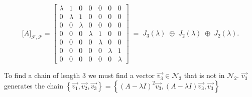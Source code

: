 \documentclass{report}
\begin{document}
{    \[
\bigl[A\bigr]_{\mathcal{F},\mathcal{F}}
=
\left[
\begin{array}{ccc|cc|cc}
\lambda & 1 & 0 & 0 & 0 & 0 & 0\\
0 & \lambda & 1 & 0 & 0 & 0 & 0\\
0 & 0 & \lambda & 0 & 0 & 0 & 0\\ \hline
0 & 0 & 0 & \lambda & 1 & 0 & 0\\
0 & 0 & 0 & 0 & \lambda & 0 & 0\\ \hline
0 & 0 & 0 & 0 & 0 & \lambda & 1\\
0 & 0 & 0 & 0 & 0 & 0 & \lambda
\end{array}
\right]
\;=\;
J_{3}(\lambda)\;\oplus\;J_{2}(\lambda)\;\oplus\;J_{2}(\lambda).
\]




  To find a chain of length $ 3$  we must find a vector $ \vec{ v_3} \in \mathcal{N} _3$  that is not in $ \mathcal{N} _2$. $ \vec{ v_3} $ generates the chain $ \left\{ \vec{ v_1} , \vec{ v_2}, \vec{ v_3}   \right\} = \left\{ \left( A- \lambda I \right) ^2 \vec{ v_3} , \left( A - \lambda I  \right) \vec{ v_3} , \vec{ v_3}  \right\} $
  }
  
\end{document}
